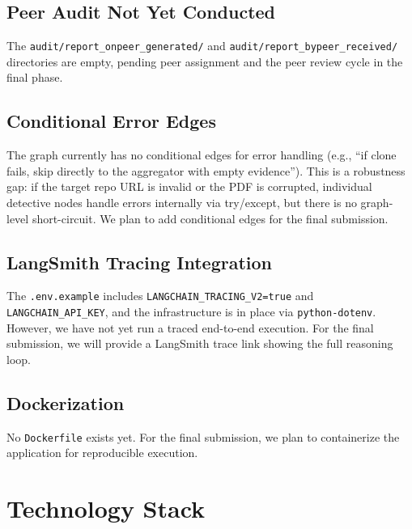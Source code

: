 \documentclass[12pt,a4paper]{article}
\begin{document}
\subsection{Peer Audit Not Yet Conducted}

The \texttt{audit/report\_onpeer\_generated/} and \texttt{audit/report\_bypeer\_received/} directories are empty, pending peer assignment and the peer review cycle in the final phase.

\subsection{Conditional Error Edges}

The graph currently has no conditional edges for error handling (e.g., ``if clone fails, skip directly to the aggregator with empty evidence''). This is a robustness gap: if the target repo URL is invalid or the PDF is corrupted, individual detective nodes handle errors internally via try/except, but there is no graph-level short-circuit. We plan to add conditional edges for the final submission.

\subsection{LangSmith Tracing Integration}

The \texttt{.env.example} includes \texttt{LANGCHAIN\_TRACING\_V2=true} and \texttt{LANGCHAIN\_API\_KEY}, and the infrastructure is in place via \texttt{python-dotenv}. However, we have not yet run a traced end-to-end execution. For the final submission, we will provide a LangSmith trace link showing the full reasoning loop.

\subsection{Dockerization}

No \texttt{Dockerfile} exists yet. For the final submission, we plan to containerize the application for reproducible execution.


\section{Technology Stack}
\end{document}
